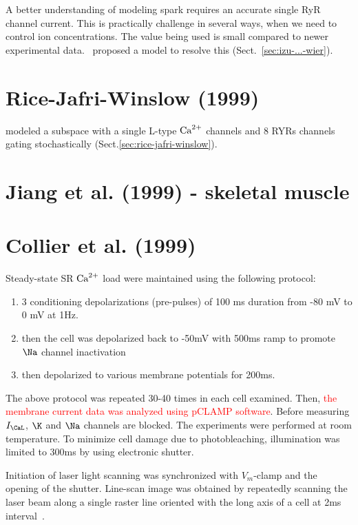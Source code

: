 A better understanding of modeling spark requires an accurate single
RyR channel current. This is practically challenge in several ways,
when we need to control ion concentrations. The value being used is
small compared to newer experimental data.~\citep{izu2001lcg} proposed
a model to resolve this (Sect.~\ref{sec:izu-...-wier}). 



\section{Rice-Jafri-Winslow (1999)}

\citep{rice1999mgg} modeled a subspace with a single L-type ${\text{Ca}^{2+}}$ channels and 8
RYRs channels gating stochastically (Sect.\ref{sec:rice-jafri-winslow}). 


\section{Jiang et al. (1999) - skeletal muscle}


\citep{jiang1999}


\section{Collier et al. (1999)}
\label{sec:collier-et-al}

Steady-state SR ${\text{Ca}^{2+}}$ load were maintained using the following
protocol:
\begin{enumerate}
\item 3 conditioning depolarizations (pre-pulses) of 100 ms duration
  from -80 mV to 0 mV at 1Hz.
\item then the cell was depolarized back to -50mV with 500ms ramp to
  promote $\Na$ channel inactivation 

\item then depolarized to various membrane potentials for 200ms. 
\end{enumerate}
The above protocol was repeated 30-40 times in each cell
examined. Then,
\textcolor{red}{the membrane current data was analyzed using pCLAMP
  software}. Before measuring $I_\CaL$, $\K$ and $\Na$ channels are
  blocked. The experiments were performed at room temperature. To
  minimize cell damage due to photobleaching, illumination was limited
  to 300ms by using electronic shutter.

Initiation of laser light scanning was synchronized with $V_m$-clamp
and the opening of the shutter. Line-scan image was obtained by
repeatedly scanning the laser beam along a single raster line oriented
with the long axis of a cell at 2ms
interval~\citep{cheng1993cse, cannell1995b}. 

